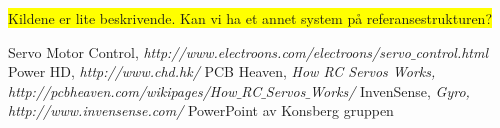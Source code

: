\colorbox{yellow}{Kildene er lite beskrivende. Kan vi ha et annet system på referansestrukturen?}
\begin{thebibliography}{9}

 \label{ref:PWM} Servo Motor Control, \emph{http://www.electroons.com/electroons/servo$\_$control.html}
 \label{ref:PowerHD} 
Power HD, \emph{http://www.chd.hk/}
 \label{ref:SerCtrl} PCB Heaven, \emph{How RC Servos Works, http://pcbheaven.com/wikipages/How$\_$RC$\_$Servos$\_$Works/}
 \label{ref:InSens} InvenSense, \emph{Gyro, http://www.invensense.com/}
 \label{ref:PowerPoint} PowerPoint av Konsberg gruppen

\end{thebibliography}